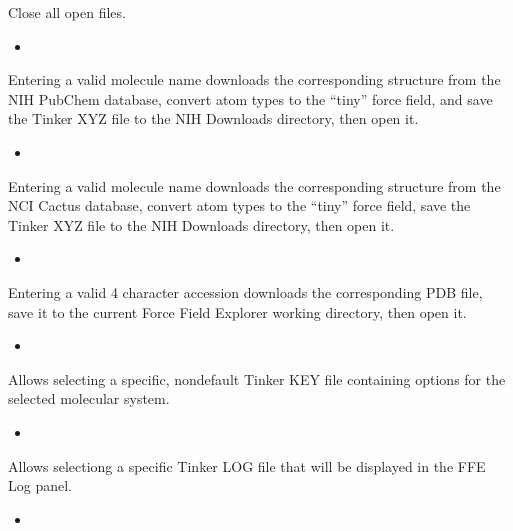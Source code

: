 \documentclass[letterpaper,11pt,english]{sphinxmanual}
\begin{document}
\sphinxAtStartPar
Close all open files.
\begin{itemize}
\item {} 
\sphinxAtStartPar
{}

\end{itemize}

\sphinxAtStartPar
Entering a valid molecule name downloads the corresponding structure from the NIH PubChem database, convert atom types to the “tiny” force field, and save the Tinker XYZ file to the NIH Downloads directory, then open it.
\begin{itemize}
\item {} 
\sphinxAtStartPar
{}

\end{itemize}

\sphinxAtStartPar
Entering a valid molecule name downloads the corresponding structure from the NCI Cactus database, convert atom types to the “tiny” force field, save the Tinker XYZ file to the NIH Downloads directory, then open it.
\begin{itemize}
\item {} 
\sphinxAtStartPar
{}

\end{itemize}

\sphinxAtStartPar
Entering a valid 4 character accession downloads the corresponding PDB file, save it to the current Force Field Explorer working directory, then open it.
\begin{itemize}
\item {} 
\sphinxAtStartPar
{}

\end{itemize}

\sphinxAtStartPar
Allows selecting a specific, non\sphinxhyphen{}default Tinker KEY file containing options for the selected molecular system.
\begin{itemize}
\item {} 
\sphinxAtStartPar
{}

\end{itemize}

\sphinxAtStartPar
Allows selectiong a specific Tinker LOG file that will be displayed in the FFE Log panel.
\begin{itemize}
\item {} 
\sphinxAtStartPar
{}

\end{itemize}
\end{document}
